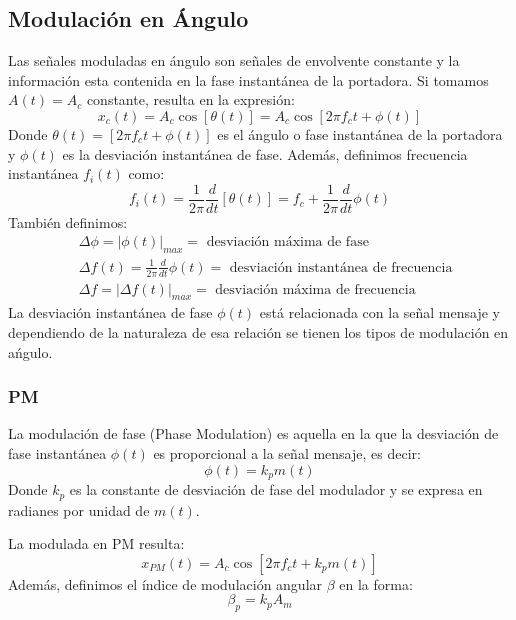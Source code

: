 \documentclass[11pt,a4paper]{article}
\numberwithin{equation}{section}
\begin{document}
\subsection{Modulación en Ángulo}
Las señales moduladas en ángulo son señales de envolvente constante y la información esta contenida en la fase instantánea de la portadora. Si tomamos $A(t)=A_c$ constante, resulta en la expresión:
\begin{equation}\label{eq:x_ang}
  x_c(t)=A_c\cos[\theta(t)]=A_c\cos[2\pi f_ct + \phi(t)]
\end{equation}
Donde $\theta(t)=[2\pi f_ct + \phi(t)]$ es el ángulo o fase instantánea de la portadora y $\phi(t)$ es la desviación instantánea de fase. Además, definimos frecuencia instantánea $f_i(t)$ como:
\begin{equation}
  f_i(t)=\frac{1}{2\pi}\frac{d}{dt}[\theta(t)]=f_c+\frac{1}{2\pi}\frac{d}{dt}\phi(t)
\end{equation}
También definimos:
\begin{equation}
  \begin{aligned}
    &\Delta\phi=\lvert\phi(t)\rvert_{max} = \text{ desviación máxima de fase}\\
    &\Delta f(t)=\frac{1}{2\pi}\frac{d}{dt}\phi(t) = \text{ desviación instantánea de frecuencia}\\
    &\Delta f=\lvert\Delta f(t)\rvert_{max}= \text{ desviación máxima de frecuencia}
  \end{aligned}
\end{equation}
La desviación instantánea de fase $\phi(t)$ está relacionada con la señal mensaje y dependiendo de la naturaleza de esa relación se tienen los tipos de modulación en ańgulo.

\subsubsection{PM}
La modulación de fase (Phase Modulation) es aquella en la que la desviación de fase instantánea $\phi (t)$ es proporcional a la señal mensaje, es decir:
\begin{equation}
  \phi(t)=k_pm(t)
\end{equation}
Donde $k_p$ es la constante de desviación de fase del modulador y se expresa en radianes por unidad de $m(t)$.

La modulada en PM resulta:
\begin{equation}
  x_{PM}(t)=A_c\cos[2\pi f_c t + k_pm(t)]
\end{equation}
Además, definimos el índice de modulación angular $\beta$ en la forma:
\begin{equation}
  \beta_p = k_pA_m
\end{equation}
\end{document}
